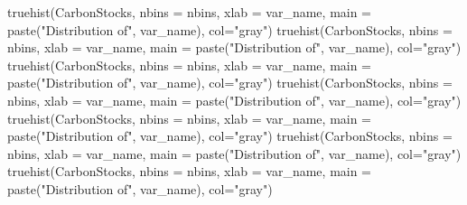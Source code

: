 \documentclass[
]{article}
\newenvironment{Shaded}{}{}
\newcommand{\AttributeTok}[1]{\textcolor[rgb]{0.49,0.56,0.16}{#1}}
\newcommand{\FunctionTok}[1]{\textcolor[rgb]{0.02,0.16,0.49}{#1}}
\newcommand{\NormalTok}[1]{#1}
\newcommand{\StringTok}[1]{\textcolor[rgb]{0.25,0.44,0.63}{#1}}
\begin{document}
\begin{Shaded}
\begin{Highlighting}[]
\FunctionTok{truehist}\NormalTok{(CarbonStocks, }\AttributeTok{nbins =}\NormalTok{ nbins, }\AttributeTok{xlab =}\NormalTok{ var\_name, }\AttributeTok{main =} \FunctionTok{paste}\NormalTok{(}\StringTok{"Distribution of"}\NormalTok{, var\_name), }\AttributeTok{col=}\StringTok{"gray"}\NormalTok{)}
\FunctionTok{truehist}\NormalTok{(CarbonStocks, }\AttributeTok{nbins =}\NormalTok{ nbins, }\AttributeTok{xlab =}\NormalTok{ var\_name, }\AttributeTok{main =} \FunctionTok{paste}\NormalTok{(}\StringTok{"Distribution of"}\NormalTok{, var\_name), }\AttributeTok{col=}\StringTok{"gray"}\NormalTok{)}
\FunctionTok{truehist}\NormalTok{(CarbonStocks, }\AttributeTok{nbins =}\NormalTok{ nbins, }\AttributeTok{xlab =}\NormalTok{ var\_name, }\AttributeTok{main =} \FunctionTok{paste}\NormalTok{(}\StringTok{"Distribution of"}\NormalTok{, var\_name), }\AttributeTok{col=}\StringTok{"gray"}\NormalTok{)}
\FunctionTok{truehist}\NormalTok{(CarbonStocks, }\AttributeTok{nbins =}\NormalTok{ nbins, }\AttributeTok{xlab =}\NormalTok{ var\_name, }\AttributeTok{main =} \FunctionTok{paste}\NormalTok{(}\StringTok{"Distribution of"}\NormalTok{, var\_name), }\AttributeTok{col=}\StringTok{"gray"}\NormalTok{)}
\FunctionTok{truehist}\NormalTok{(CarbonStocks, }\AttributeTok{nbins =}\NormalTok{ nbins, }\AttributeTok{xlab =}\NormalTok{ var\_name, }\AttributeTok{main =} \FunctionTok{paste}\NormalTok{(}\StringTok{"Distribution of"}\NormalTok{, var\_name), }\AttributeTok{col=}\StringTok{"gray"}\NormalTok{)}
\FunctionTok{truehist}\NormalTok{(CarbonStocks, }\AttributeTok{nbins =}\NormalTok{ nbins, }\AttributeTok{xlab =}\NormalTok{ var\_name, }\AttributeTok{main =} \FunctionTok{paste}\NormalTok{(}\StringTok{"Distribution of"}\NormalTok{, var\_name), }\AttributeTok{col=}\StringTok{"gray"}\NormalTok{)}
\FunctionTok{truehist}\NormalTok{(CarbonStocks, }\AttributeTok{nbins =}\NormalTok{ nbins, }\AttributeTok{xlab =}\NormalTok{ var\_name, }\AttributeTok{main =} \FunctionTok{paste}\NormalTok{(}\StringTok{"Distribution of"}\NormalTok{, var\_name), }\AttributeTok{col=}\StringTok{"gray"}\NormalTok{)}
\end{Highlighting}
\end{Shaded}
\end{document}

